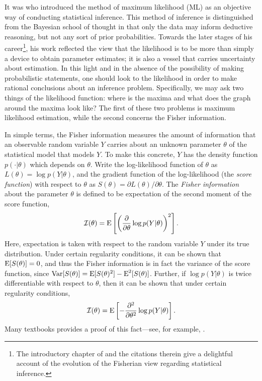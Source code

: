 It was \citet{ra1922mathematical} who introduced the method of maximum likelihood (ML) as an objective way of conducting statistical inference.
This method of inference is distinguished from the Bayesian school of thought in that only the data may inform deductive reasoning, but not any sort of  prior probabilities.
Towards the later stages of his career\footnote{The introductory chapter of \citet{pawitan2001all} and the citations therein give a delightful  account of the evolution of the Fisherian view regarding statistical inference.}, his work reflected the view that the likelihood is to be more than simply a device to obtain parameter estimates; it is also a vessel that carries uncertainty about estimation.
In this light and in the absence of the possibility of making probabilistic statements, one should look to the likelihood in order to make rational conclusions about an inference problem.
Specifically, we may ask two things of the likelihood function: where is the maxima and what does the graph around the maxima look like?
The first of these two problems is maximum likelihood estimation, while the second concerns the Fisher information.

In simple terms, the Fisher information measures the amount of information that an observable random variable $Y$ carries about an unknown parameter $\theta$ of the statistical model that models $Y$.
To make this concrete, $Y$ has the density function $p(\cdot|\theta)$ which depends on $\theta$.
Write the log-likelihood function of $\theta$ as $L(\theta) = \log p(Y|\theta)$, and the gradient function of the log-likelihood (the \emph{score function}) with respect to $\theta$ as $S(\theta) = \partial L(\theta)/\partial\theta$.
The \emph{Fisher information} about the parameter $\theta$ is defined to be expectation of the second moment of the score function, 
\[
  {\mathcal I}(\theta) = \operatorname{E}\left[\left(\frac{\partial}{\partial\theta} \log p(Y|\theta)\right)^2\right].
\]
Here, expectation is taken with respect to the random variable $Y$ under its true distribution.
Under certain regularity conditions, it can be shown that $\operatorname{E}[S(\theta)] = 0$, and thus the Fisher information is in fact the variance of the score function, since $\operatorname{Var}[S(\theta)] = \operatorname{E}[S(\theta)^2] - \operatorname{E}^2[S(\theta)]$.
Further, if $\log p(Y|\theta)$ is twice differentiable with respect to $\theta$, then it can be shown that under certain regularity conditions,
\[
  {\mathcal I}(\theta) = \operatorname{E}\left[-\frac{\partial ^ 2}{\partial\theta^2} \log p(Y|\theta)\right].
\]
Many textbooks provides a proof of this fact---see, for example, \citet[sec. 9.7]{wasserman2013all}.

